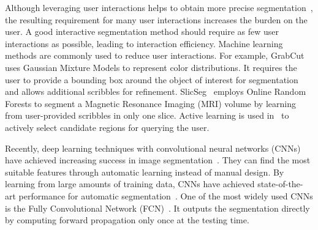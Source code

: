 \documentclass[10pt,journal,compsoc]{IEEEtran}
\begin{document}
Although leveraging user interactions helps to obtain more precise segmentation~\cite{Boykov2001, Xu1998,Grady2006a, Criminisi2008}, the resulting requirement for many user interactions increases the burden on the user. A good interactive segmentation method should require as few user interactions as possible, leading to interaction efficiency. Machine learning methods are commonly used to reduce user interactions. For example, GrabCut~\cite{Rother2004} uses Gaussian Mixture Models to represent color distributions. It requires the user to provide a bounding box around the object of interest for segmentation and allows additional scribbles for refinement. SlicSeg~\cite{Wang2016} employs Online Random Forests to segment a Magnetic Resonance Imaging (MRI) volume by learning from user-provided scribbles in only one slice. Active
learning is used in~\cite{Wang2014a} to actively select candidate regions for querying the user.

Recently, deep learning techniques with convolutional neural networks (CNNs) have achieved increasing success in image segmentation~\cite{Girshick2014, Long2014, Chen2015iclr}. %
They can find the most suitable features through automatic learning instead of manual design. %
By learning from large amounts of training data, CNNs have achieved state-of-the-art performance for automatic segmentation~\cite{Chen2015iclr,Havaei2016, Kamnitsas2017}. One of the most widely used CNNs is the Fully Convolutional Network (FCN)~\cite{Long2014}. It outputs the segmentation directly by computing forward propagation only once at the testing time.
\end{document}
